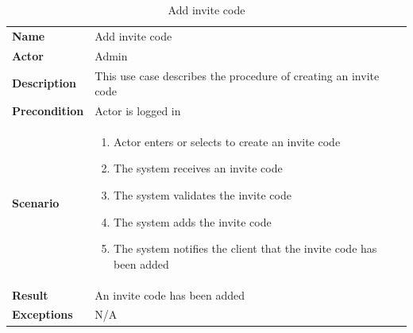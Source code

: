 \begin{table}[ht]
    \caption{Add invite code}
    \begin{tabular}{|L{5cm}|L{10cm}|}
        \toprule
        \textbf{Name}         & Add invite code      \\
        \textbf{Actor}        & Admin              \\
        \textbf{Description} & This use case describes the procedure of creating an invite code \\
        \textbf{Precondition} & Actor is logged in \\
        \textbf{Scenario} &
        \vspace{-0.75cm}
        \begin{enumerate}
            \setlength\itemsep{-0.5em}
            \item Actor enters or selects to create an invite code
            \item The system receives an invite code
            \item The system validates the invite code
            \item The system adds the invite code
            \item The system notifies the client that the invite code has been added
        \end{enumerate} \\[-0.5cm]
        \textbf{Result} &  An invite code has been added \\
        \textbf{Exceptions}   & N/A                \\
        \bottomrule
    \end{tabular}
    \label{tab:table37}
\end{table}

